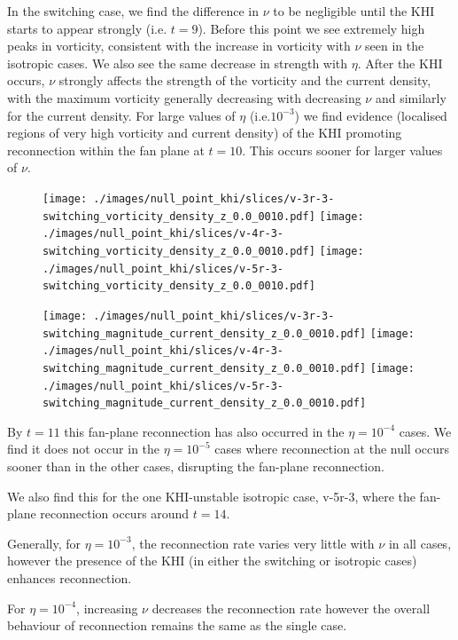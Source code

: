 In the switching case, we find the difference in $\nu$ to be negligible until the KHI starts to appear strongly (i.e. $t=9$). Before this point we see extremely high peaks in vorticity, consistent with the increase in vorticity with $\nu$ seen in the isotropic cases. We also see the same decrease in strength with $\eta$. After the KHI occurs, $\nu$ strongly affects the strength of the vorticity and the current density, with the maximum vorticity generally decreasing with decreasing $\nu$ and similarly for the current density. For large values of $\eta$ (i.e.$10^{-3}$) we find evidence (localised regions of very high vorticity and current density) of the KHI promoting reconnection within the fan plane at $t=10$. This occurs sooner for larger values of $\nu$.

\begin{figure}[H]
  \centering
  \texttt{[image: ./images/null\_point\_khi/slices/v-3r-3-switching\_vorticity\_density\_z\_0.0\_0010.pdf]}
  \texttt{[image: ./images/null\_point\_khi/slices/v-4r-3-switching\_vorticity\_density\_z\_0.0\_0010.pdf]}
  \texttt{[image: ./images/null\_point\_khi/slices/v-5r-3-switching\_vorticity\_density\_z\_0.0\_0010.pdf]}
\end{figure}

\begin{figure}[H]
  \centering
  \texttt{[image: ./images/null\_point\_khi/slices/v-3r-3-switching\_magnitude\_current\_density\_z\_0.0\_0010.pdf]}
  \texttt{[image: ./images/null\_point\_khi/slices/v-4r-3-switching\_magnitude\_current\_density\_z\_0.0\_0010.pdf]}
  \texttt{[image: ./images/null\_point\_khi/slices/v-5r-3-switching\_magnitude\_current\_density\_z\_0.0\_0010.pdf]}
\end{figure}

By $t=11$ this fan-plane reconnection has also occurred in the $\eta=10^{-4}$ cases. We find it does not occur in the $\eta=10^{-5}$ cases where reconnection at the null occurs sooner than in the other cases, disrupting the fan-plane reconnection.

We also find this for the one KHI-unstable isotropic case, v-5r-3, where the fan-plane reconnection occurs around $t=14$.

Generally, for $\eta=10^{-3}$, the reconnection rate varies very little with $\nu$ in all cases, however the presence of the KHI (in either the switching or isotropic cases) enhances reconnection.

For $\eta=10^{-4}$, increasing $\nu$ decreases the reconnection rate however the overall behaviour of reconnection remains the same as the single case.

